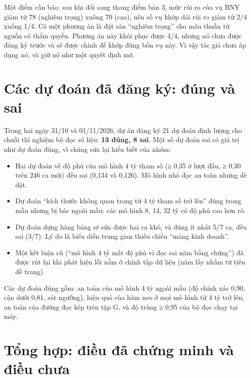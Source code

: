 Một điểm cần báo: sau khi đổi sang thang điểm bản 3, mức rủi ro của vụ BNY giảm từ 78 (nghiêm trọng) xuống 70 (cao), nên số vụ khớp dải rủi ro giảm từ 2/4 xuống 1/4. Có một phương án là đặt sàn “nghiêm trọng” cho mâu thuẫn từ nguồn có thẩm quyền. Phương án này khôi phục được 4/4, nhưng nó chưa được đăng ký trước và sẽ được chỉnh để khớp đúng bốn vụ này. Vì vậy tác giả chưa áp dụng nó, và giữ nó như một quyết định mở.

\section{Các dự đoán đã đăng ký: đúng và sai}\label{sec:du-doan}

Trong hai ngày 31/10 và 01/11/2026, dự án đăng ký 21 dự đoán định lượng cho chuỗi thí nghiệm bộ đọc số liệu: \textbf{13 đúng, 8 sai}. Một số dự đoán sai có giá trị như dự đoán đúng, vì chúng sửa lại hiểu biết của nhóm:
\begin{itemize}
\item Hai dự đoán về độ phủ của mô hình 4 tỷ tham số (≥ 0,35 ở lượt đầu, ≥ 0,30 trên 246 ca mới) đều sai (0,134 và 0,126). Mô hình nhỏ đọc an toàn nhưng dè dặt.
\item Dự đoán “kích thước không quan trọng từ 4 tỷ tham số trở lên” đúng trong mẫu nhưng bị bác ngoài mẫu: các mô hình 8, 14, 32 tỷ có độ phủ cao hơn rõ.
\item Dự đoán dựng hàng bảng sẽ sửa được hai ca khó, và đúng ít nhất 5/7 ca, đều sai (3/7). Lý do là biểu diễn trung gian thiếu chiều “mảng kinh doanh”.
\item Một kết luận cũ (“mô hình 4 tỷ mất độ phủ vì đọc sai năm bằng chứng”) đã được rút lại khi phát hiện lỗi nằm ở chính tập dữ liệu (năm lấy nhầm từ tiêu đề trang).
\end{itemize}
Các dự đoán đúng gồm: an toàn của mô hình 4 tỷ ngoài mẫu (độ chính xác 0,90, cận dưới 0,81, sát ngưỡng), hiệu quả của hàm neo ở mọi mô hình từ 4 tỷ trở lên, an toàn của đường đọc kép trên tập G, và độ trùng ≥ 0,95 của bộ đọc chạy tại máy.

\section{Tổng hợp: điều đã chứng minh và điều chưa}

